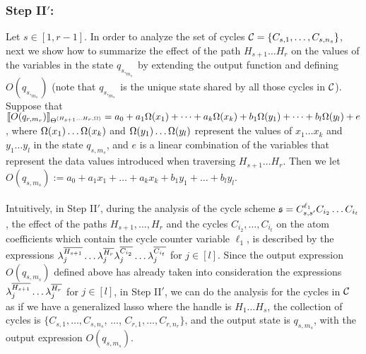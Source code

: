 \subsubsection{Step II$'$:}
Let $s\in [1,r-1]$. In order to analyze the set of cycles ${\mathcal{C} }=\{C_{s,1},\dots,C_{s,n_{s}}\}$, next we show how to summarize the effect of the path $H_{s+1}\dots H_r$ on the values of the variables in the state $q_{s,_{m_s}}$ by extending the output function and defining $O(q_{s,_{m_s}})$ (note that $q_{s,_{m_s}}$ is the unique state shared by all those cycles in ${\mathcal{C} }$).
Suppose that $\llbracket O(q_{r,m_r})\rrbracket_{\Theta^{(H_{s+1}\dots H_{r}, \Omega)}}=a_0+a_1 \Omega(x_1)+ \dots + a_k \Omega(x_k) + b_1 \Omega(y_1) + \dots + b_l \Omega(y_l)+e$, where $\Omega(x_1)\dots\Omega(x_k)$ and $\Omega(y_1)\ldots \Omega(y_l)$ represent the values of $x_1\dots x_k$ and $y_1 \dots y_l$ in the state $q_{s, m_{s}}$, and $e$ is a linear combination of the variables that represent the data values introduced when traversing $H_{s+1}\dots H_r$. 
Then we let
$O(q_{s, m_{s}}):=a_0+a_1 x_1 + \dots + a_k x_k + b_1 y_1 + \dots + b_l y_l$.
\medskip\\
\medskip\\
Intuitively, in Step II$'$, during the analysis of the cycle scheme ${\mathfrak{s} } = C^{\ell_1}_{s,s'} C_{i_{2}} \dots C_{i_{t}}$, the effect of the paths $H_{s+1},  \dots,  H_r$ and the cycles $C_{i_{2}}, \dots, C_{i_{t}}$ on the atom coefficients which contain the cycle counter variable $\ell_1$, is described by the expressions  $\lambda^{\overline{H_{s+1}}}_j \dots \lambda^{\overline{H_{r}}}_j  \lambda^{\overline{C_{i_{2}}}}_j \dots \lambda^{\overline{C_{i_{t}}}}_j $ for $j \in [l]$. Since the output expression $O(q_{s, m_{s}})$ defined above has already taken into consideration the expressions $\lambda^{\overline{H_{s+1}}}_j \dots \lambda^{\overline{H_{r}}}_j$ for $j \in [l]$, in Step II$'$, we can do the analysis for the cycles in ${\mathcal{C} }$ as if we have a generalized lasso where the handle is $H_1\dots H_s$, the collection of cycles is $\{C_{s,1},\dots, C_{s,n_s}$, $\dots$, $C_{r,1},\dots, C_{r,n_r}\}$, and the output state is $q_{s,m_s}$, with the output expression  $O(q_{s, m_{s}})$.

